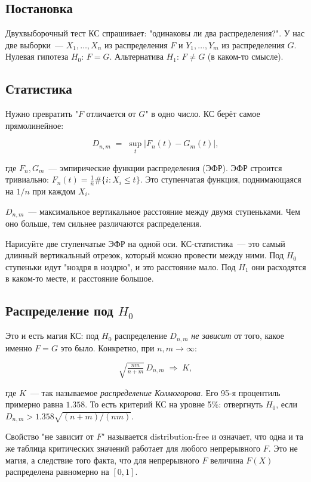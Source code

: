 \documentclass[11pt]{article}
\begin{document}
\subsection{Постановка}

Двухвыборочный тест КС спрашивает: "одинаковы ли два распределения?". У нас две выборки~--- $X_1, \ldots, X_n$ из распределения $F$ и $Y_1, \ldots, Y_m$ из распределения $G$. Нулевая гипотеза $H_0$: $F = G$. Альтернатива $H_1$: $F \neq G$ (в каком-то смысле).

\subsection{Статистика}

Нужно превратить "$F$ отличается от $G$" в одно число. КС берёт самое прямолинейное:

\[
D_{n,m} \;=\; \sup_t \bigl|F_n(t) - G_m(t)\bigr|,
\]

где $F_n, G_m$~--- эмпирические функции распределения (ЭФР). ЭФР строится тривиально: $F_n(t) = \frac{1}{n}\#\{i : X_i \leq t\}$. Это ступенчатая функция, поднимающаяся на $1/n$ при каждом $X_i$.

$D_{n,m}$~--- максимальное вертикальное расстояние между двумя ступеньками. Чем оно больше, тем сильнее различаются распределения.

\begin{intuition}
Нарисуйте две ступенчатые ЭФР на одной оси. КС-статистика~--- это самый длинный вертикальный отрезок, который можно провести между ними. Под $H_0$ ступеньки идут "ноздря в ноздрю", и это расстояние мало. Под $H_1$ они расходятся в каком-то месте, и расстояние большое.
\end{intuition}

\subsection{Распределение под $H_0$}

Это и есть магия КС: под $H_0$ распределение $D_{n,m}$ \emph{не зависит} от того, какое именно $F = G$ это было. Конкретно, при $n, m \to \infty$:

\[
\sqrt{\tfrac{nm}{n+m}}\, D_{n,m} \;\Rightarrow\; K,
\]

где $K$~--- так называемое \emph{распределение Колмогорова}. Его 95-я процентиль примерно равна $1.358$. То есть критерий КС на уровне 5\%: отвергнуть $H_0$, если $D_{n,m} > 1.358 \sqrt{(n+m)/(nm)}$.

Свойство "не зависит от $F$" называется distribution-free и означает, что одна и та же таблица критических значений работает для любого непрерывного $F$. Это не магия, а следствие того факта, что для непрерывного $F$ величина $F(X)$ распределена равномерно на $[0,1]$.
\end{document}
